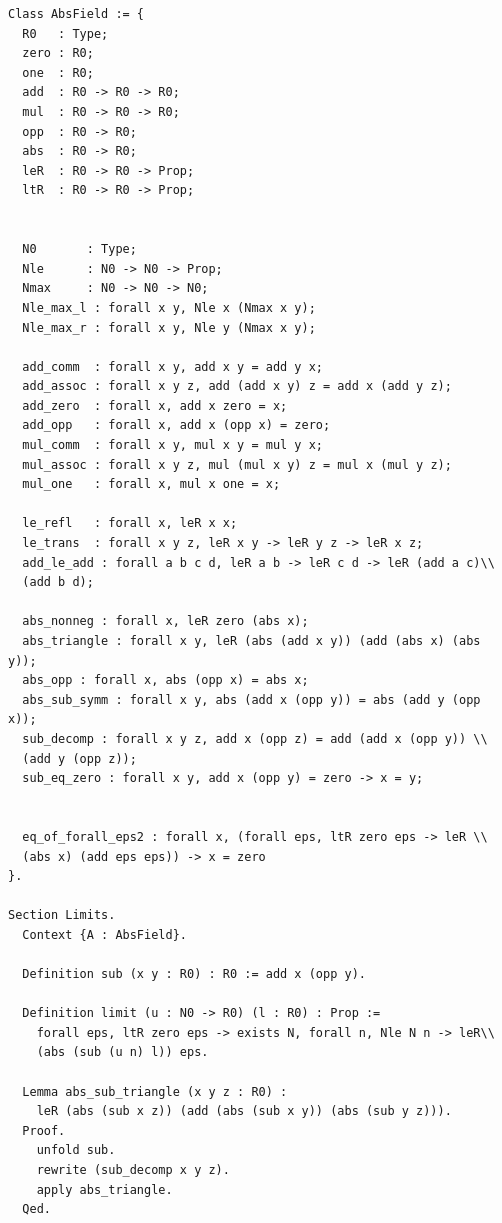 \documentclass{article}
\begin{document}
\begin{verbatim}
Class AbsField := {
  R0   : Type;
  zero : R0;
  one  : R0;
  add  : R0 -> R0 -> R0;
  mul  : R0 -> R0 -> R0;
  opp  : R0 -> R0;
  abs  : R0 -> R0;
  leR  : R0 -> R0 -> Prop;
  ltR  : R0 -> R0 -> Prop;


  N0       : Type;
  Nle      : N0 -> N0 -> Prop;
  Nmax     : N0 -> N0 -> N0;
  Nle_max_l : forall x y, Nle x (Nmax x y);
  Nle_max_r : forall x y, Nle y (Nmax x y);

  add_comm  : forall x y, add x y = add y x;
  add_assoc : forall x y z, add (add x y) z = add x (add y z);
  add_zero  : forall x, add x zero = x;
  add_opp   : forall x, add x (opp x) = zero;
  mul_comm  : forall x y, mul x y = mul y x;
  mul_assoc : forall x y z, mul (mul x y) z = mul x (mul y z);
  mul_one   : forall x, mul x one = x;

  le_refl   : forall x, leR x x;
  le_trans  : forall x y z, leR x y -> leR y z -> leR x z;
  add_le_add : forall a b c d, leR a b -> leR c d -> leR (add a c)\\
  (add b d);

  abs_nonneg : forall x, leR zero (abs x);
  abs_triangle : forall x y, leR (abs (add x y)) (add (abs x) (abs y));
  abs_opp : forall x, abs (opp x) = abs x;
  abs_sub_symm : forall x y, abs (add x (opp y)) = abs (add y (opp x));
  sub_decomp : forall x y z, add x (opp z) = add (add x (opp y)) \\
  (add y (opp z));
  sub_eq_zero : forall x y, add x (opp y) = zero -> x = y;


  eq_of_forall_eps2 : forall x, (forall eps, ltR zero eps -> leR \\
  (abs x) (add eps eps)) -> x = zero
}.

Section Limits.
  Context {A : AbsField}.

  Definition sub (x y : R0) : R0 := add x (opp y).

  Definition limit (u : N0 -> R0) (l : R0) : Prop :=
    forall eps, ltR zero eps -> exists N, forall n, Nle N n -> leR\\
    (abs (sub (u n) l)) eps.

  Lemma abs_sub_triangle (x y z : R0) :
    leR (abs (sub x z)) (add (abs (sub x y)) (abs (sub y z))).
  Proof.
    unfold sub.
    rewrite (sub_decomp x y z).
    apply abs_triangle.
  Qed.


\end{verbatim}
\end{document}
